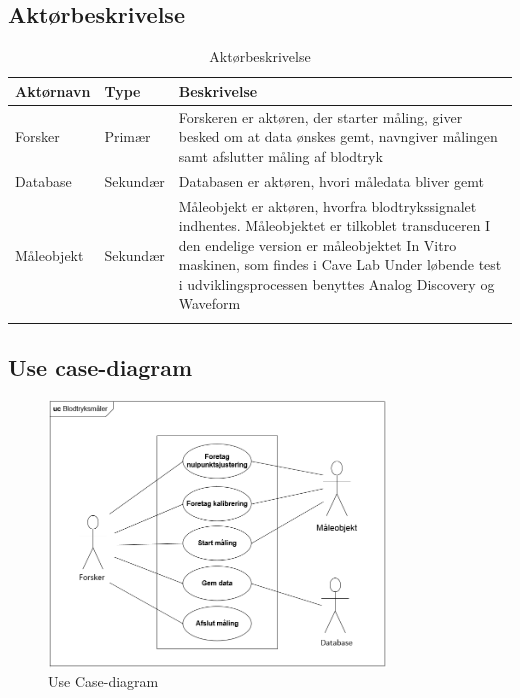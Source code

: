 \subsection{Aktørbeskrivelse}

\begin{table}[H]
\begin{tabularx}{\textwidth}{l l X}
     Aktørnavn	&	Type		&	Beskrivelse \\ \midrule
     Forsker   	& 	Primær  	& 	Forskeren er aktøren, der starter måling, giver besked om at data ønskes gemt, navngiver målingen samt afslutter måling af blodtryk \\ 			  \addlinespace[2mm]
     Database	&	Sekundær	&	Databasen er aktøren, hvori måledata bliver gemt \\   \addlinespace[2mm]
     Måleobjekt	&	Sekundær	&	Måleobjekt er aktøren, hvorfra blodtrykssignalet indhentes. Måleobjektet er tilkoblet transduceren
     I den endelige version er måleobjektet In Vitro maskinen, som findes i Cave Lab
     Under løbende test i udviklingsprocessen benyttes Analog Discovery og Waveform \\   \addlinespace[2mm]
     
   
     \bottomrule                                                                                                                   
    \end{tabularx}
    \caption {Aktørbeskrivelse}
    \label{tab:aktoerbeskrivelse}
	
\end{table}

\subsection{Use case-diagram}

\begin{figure}[H]
	\centering
	\includegraphics[width=0.8\textwidth]{Figurer/UseCasediagram}
	\caption{Use Case-diagram}
	\label{fig:Use Cases}
\end{figure}

